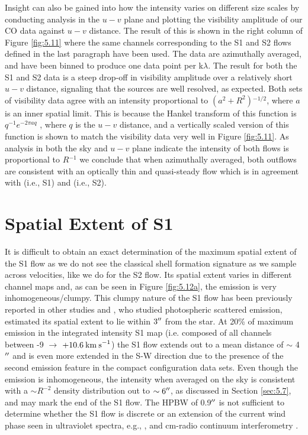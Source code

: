 Insight can also be gained into how the intensity varies on different size scales by conducting analysis in the $u-v$ plane and plotting the visibility amplitude of our CO data against $u-v$ distance. The result of this is shown in the right column of Figure \ref{fig:5.11} where the same channels corresponding to the S1 and S2 flows defined in the last paragraph have been used. The data are azimuthally averaged, and have been binned to produce one data point per k$\lambda$. The result for both the S1 and S2 data is a steep drop-off in visibility amplitude over a relatively short $u-v$ distance, signaling that the sources are well resolved, as expected. Both sets of visibility data agree with an intensity proportional to $(a^2 + R^2){}^{-1/2}$, where $a$ is an inner spatial limit. This is because the Hankel transform of this function is $q^{-1}e^{-2\pi aq}$ \citep{bracewell_2000}, where $q$ is the $u-v$ distance, and a vertically scaled version of this function is shown to match the visibility data very well in Figure \ref{fig:5.11}. As analysis in both the sky and $u-v$ plane indicate the intensity of both flows is proportional to $R{}^{-1}$ we conclude that when azimuthally averaged, both outflows are  consistent with an optically thin and quasi-steady flow which is in agreement with \cite{smith_2009} (i.e., S1) and \cite{plez_2002} (i.e., S2). 

\section{Spatial Extent of S1}\label{sec:5.8}
It is difficult to obtain an exact determination of the maximum spatial extent of the S1 flow  as we do not see the classical shell formation signature as we sample across velocities, like we do for the S2 flow. Its spatial extent varies in different channel maps and, as can be seen in Figure \ref{fig:5.12a}, the emission is very inhomogeneous/clumpy. This clumpy nature of the S1 flow has been previously reported in other studies \citep{kervella_2011,smith_2009} and \cite{smith_2009}, who studied photospheric scattered emission, estimated its spatial extent to lie within $3^{\prime\prime}$ from the star. At 20\% of maximum emission in the integrated intensity S1 map (i.e. composed of all channels between -9 $\rightarrow$ $+10.6\>{\rm km\>s}^{-1}$) the S1 flow extends out to a mean distance of $\sim$ 4$^{\prime\prime}$ and is even more extended in the S-W direction due to the presence of the second emission feature in the compact configuration data sets. Even though the emission is inhomogeneous, the intensity when averaged on the sky is consistent with a $\sim R^{-2}$ density distribution out to $\sim 6^{\prime\prime}$, as discussed in Section \ref{sec:5.7}, and may mark the end of the S1 flow. The HPBW of 0.9$^{\prime\prime}$ is not sufficient to determine whether the S1 flow is discrete or an extension of the current wind phase seen in ultraviolet spectra, e.g., \cite{carpenter_1997}, and cm-radio continuum interferometry \citep{lim_1998}.

